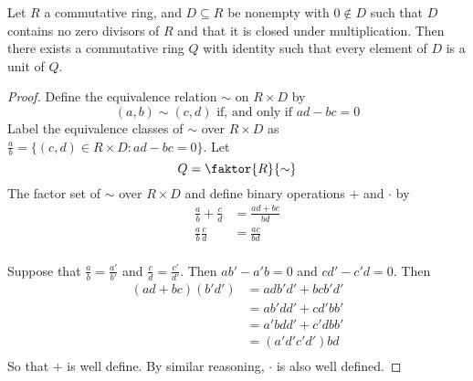 \begin{theorem}\label{1.5.2}
    Let $R$ a commutative ring, and  $D \subseteq R$ be nonempty with $0 \notin
    D$ such that $D$ contains no zero divisors of $R$ and that it is closed
    under multiplication. Then there exists a commutative ring $Q$ with identity
    such that  every element of  $D$ is a unit of $Q$.
\end{theorem}
\begin{proof}
    Define the equivalence relation $\sim$ on  $R \times D$ by
    \begin{equation*}
        (a,b) \sim (c,d) \text{ if, and only if } ad-bc=0
    \end{equation*}
    Label the equivalence classes of $\sim$ over $R \times D$ as
    $\frac{a}{b}=\{(c,d) \in R \times D : ad-bc=0\}$. Let
    \begin{equation*}
        Q=\faktor{R}{\sim}
    \end{equation*}
    The factor set of $\sim$ over $R \times D$ and define binary operations $+$
    and  $\cdot$ by
    \begin{align*}
        \frac{a}{b}+\frac{c}{d}     &=  \frac{ad+bc}{bd}    \\
        \frac{a}{b}\frac{c}{d}     &=  \frac{ac}{bd}    \\
    \end{align*}

    Suppose that $\frac{a}{b}=\frac{a'}{b'}$ and $\frac{c}{d}=\frac{c'}{d'}$.
    Then $ab'-a'b=0$ and  $cd'-c'd=0$. Then
    \begin{align*}
        (ad+bc)(b'd')       &=  adb'd'+bcb'd'  \\
                            &=  ab'dd'+cd'bb'   \\
                            &=  a'bdd'+c'dbb'   \\
                            &=  (a'd'c'd')bd    \\
    \end{align*}
    So that $+$ is well define. By similar reasoning,  $\cdot$ is also well
    defined.


\end{proof}
